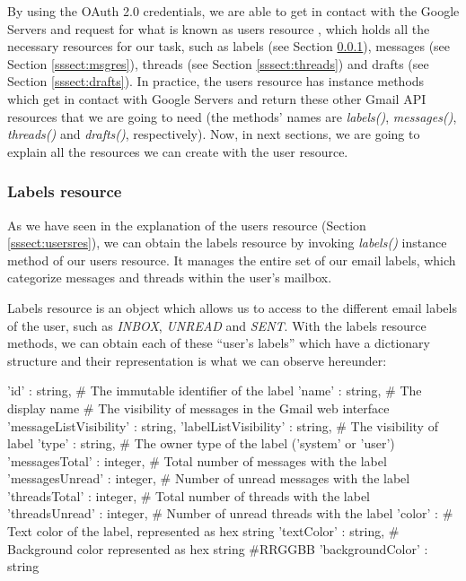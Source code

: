By using the OAuth 2.0 credentials, we are able to get in contact with the Google Servers and request for what is known as users resource \citep[/v1/reference/users]{gmailAPI}, which holds all the necessary resources for our task, such as labels (see Section \ref{sssect:labres}), messages (see Section \ref{sssect:msgres}), threads (see Section \ref{sssect:threads}) and drafts (see Section \ref{sssect:drafts}). In practice, the users resource has instance methods which get in contact with Google Servers and return these other Gmail API resources that we are going to need (the methods' names are \textit{labels()}, \textit{messages()}, \textit{threads()} and \textit{drafts()}, respectively). Now, in next sections, we are going to explain all the resources we can create with the user resource.

\subsubsection{Labels resource}\label{sssect:labres}
As we have seen in the explanation of the users resource (Section \ref{sssect:usersres}), we can obtain the labels resource \citep[/v1/reference/users/labels]{gmailAPI} by invoking \textit{labels()} instance method of our users resource. It manages the entire set of our email labels, which  categorize messages and threads within the user's mailbox.

Labels resource is an object which allows us to access to the different email labels of the user, such as \textit{INBOX}, \textit{UNREAD} and \textit{SENT}. With the labels resource methods, we can obtain each of these ``user's labels'' which have a dictionary structure and their representation is what we can observe hereunder:

\begin{python}
	{
		'id' : string, # The immutable identifier of the label
		'name' : string, # The display name
		# The visibility of messages in the Gmail web interface
		'messageListVisibility' : string,
		'labelListVisibility' : string, # The visibility of label
		'type' : string, # The owner type of the label ('system' or 'user')
		'messagesTotal' : integer, # Total number of messages with the label
		'messagesUnread' : integer, # Number of unread messages with the label
		'threadsTotal' : integer, # Total number of threads with the label
		'threadsUnread' : integer, # Number of unread threads with the label
		'color' : {
			# Text color of the label, represented as hex string
			'textColor' : string,
			# Background color represented as hex string #RRGGBB
			'backgroundColor' : string 
		}
	}
\end{python}

